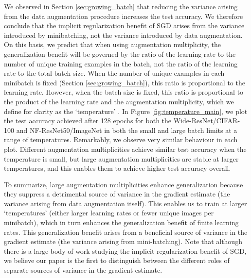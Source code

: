 \documentclass{article}
\begin{document}
We observed in Section \ref{sec:growing_batch} that reducing the variance arising from the data augmentation procedure increases the test accuracy. We therefore conclude that the implicit regularization benefit of SGD arises from the variance introduced by minibatching, not the variance introduced by data augmentation. On this basis, we predict that when using augmentation multiplicity, the generalization benefit will be governed by the ratio of the learning rate to the number of unique training examples in the batch, not the ratio of the learning rate to the total batch size. When the number of unique examples in each minibatch is fixed (Section \ref{sec:growing_batch}), this ratio is proportional to the learning rate. However, when the batch size is fixed, this ratio is proportional to the product of the learning rate and the augmentation multiplicity, which we define for clarity as the `temperature' \citep{mandt2017stochastic, smith2017bayesian, park2019effect}. In Figure \ref{fig:temperature_main}, we plot the test accuracy achieved after 128 epochs for both the Wide-ResNet/CIFAR-100 and NF-ResNet50/ImageNet in both the small and large batch limits at a range of temperatures. Remarkably, we observe very similar behaviour in each plot. Different augmentation multiplicities achieve similar test accuracy when the temperature is small, but large augmentation multiplicities are stable at larger temperatures, and this enables them to achieve higher test accuracy overall. 

To summarize, large augmentation multiplicities enhance generalization because they suppress a detrimental source of variance in the gradient estimate (the variance arising from data augmentation itself). This enables us to train at larger `temperatures' (either larger learning rates or fewer unique images per minibatch), which in turn enhances the generalization benefit of finite learning rates. This generalization benefit arises from a beneficial source of variance in the gradient estimate (the variance arising from mini-batching). Note that although there is a large body of work studying the implicit regularization benefit of SGD, we believe our paper is the first to distinguish between the different roles of separate sources of variance in the gradient estimate.
\end{document}
